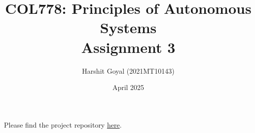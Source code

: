 \documentclass{article}
\title{COL778: Principles of Autonomous Systems\\Assignment 3}
\author{Harshit Goyal (2021MT10143)}
\date{April 2025}
\begin{document}
\maketitle
Please find the project repository \href{https://github.com/Harshit0143/COL778-Principles-of-Autonomous-System/tree/main/Assignment3}{here}.\\
\tableofcontents



\end{document}
